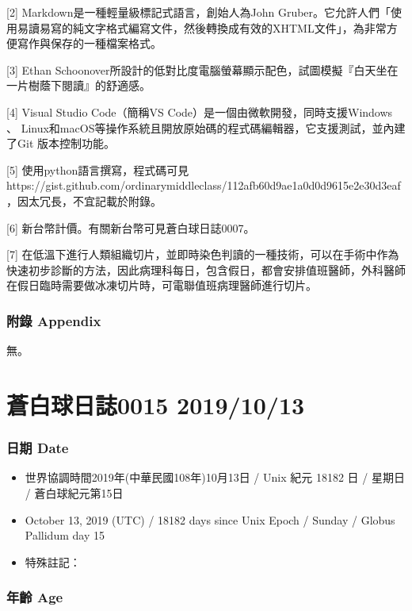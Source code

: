 \documentclass[
]{article}
\providecommand{\tightlist}{%
  \setlength{\itemsep}{0pt}\setlength{\parskip}{0pt}}
\begin{document}
{[}2{]} Markdown是一種輕量級標記式語言，創始人為John
Gruber。它允許人們「使用易讀易寫的純文字格式編寫文件，然後轉換成有效的XHTML文件」，為非常方便寫作與保存的一種檔案格式。

{[}3{]} Ethan
Schoonover所設計的低對比度電腦螢幕顯示配色，試圖模擬『白天坐在一片樹蔭下閱讀』的舒適感。

{[}4{]} Visual Studio Code（簡稱VS
Code）是一個由微軟開發，同時支援Windows 、
Linux和macOS等操作系統且開放原始碼的程式碼編輯器，它支援測試，並內建了Git
版本控制功能。

{[}5{]} 使用python語言撰寫，程式碼可見
https://gist.github.com/ordinarymiddleclass/112afb60d9ae1a0d0d9615e2e30d3eaf
，因太冗長，不宜記載於附錄。

{[}6{]} 新台幣計價。有關新台幣可見蒼白球日誌0007。

{[}7{]}
在低溫下進行人類組織切片，並即時染色判讀的一種技術，可以在手術中作為快速初步診斷的方法，因此病理科每日，包含假日，都會安排值班醫師，外科醫師在假日臨時需要做冰凍切片時，可電聯值班病理醫師進行切片。

\hypertarget{ux9644ux9304-appendix-6}{%
\subsubsection{附錄 Appendix}\label{ux9644ux9304-appendix-6}}

無。

\hypertarget{ux84bcux767dux7403ux65e5ux8a8c0015-20191013}{%
\section{蒼白球日誌0015
2019/10/13}\label{ux84bcux767dux7403ux65e5ux8a8c0015-20191013}}

\hypertarget{ux65e5ux671f-date-14}{%
\subsubsection{日期 Date}\label{ux65e5ux671f-date-14}}

\begin{itemize}
\tightlist
\item
  世界協調時間2019年(中華民國108年)10月13日 / Unix 紀元 18182 日 /
  星期日 / 蒼白球紀元第15日
\item
  October 13, 2019 (UTC) / 18182 days since Unix Epoch / Sunday / Globus
  Pallidum day 15
\item
  特殊註記：
\end{itemize}

\hypertarget{ux5e74ux9f61-age-14}{%
\subsubsection{年齡 Age}\label{ux5e74ux9f61-age-14}}
\end{document}
